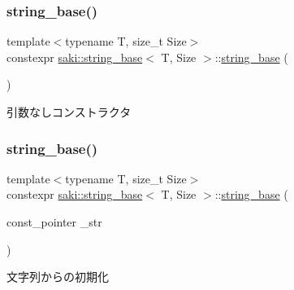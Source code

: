 \subsubsection{\texorpdfstring{string\+\_\+base()}{string\_base()}\hspace{0.1cm}{\footnotesize\ttfamily [1/3]}}
{\footnotesize\ttfamily template$<$typename T, size\+\_\+t Size$>$ \\
constexpr \mbox{\hyperlink{classsaki_1_1string__base}{saki\+::string\+\_\+base}}$<$ T, Size $>$\+::\mbox{\hyperlink{classsaki_1_1string__base}{string\+\_\+base}} (\begin{DoxyParamCaption}{ }\end{DoxyParamCaption})\hspace{0.3cm}{\ttfamily [inline]}}



引数なしコンストラクタ 

\mbox{\label{classsaki_1_1string__base_add4f032c858fa8e9f93ab0ab810488d2}} 
\subsubsection{\texorpdfstring{string\+\_\+base()}{string\_base()}\hspace{0.1cm}{\footnotesize\ttfamily [2/3]}}
{\footnotesize\ttfamily template$<$typename T, size\+\_\+t Size$>$ \\
constexpr \mbox{\hyperlink{classsaki_1_1string__base}{saki\+::string\+\_\+base}}$<$ T, Size $>$\+::\mbox{\hyperlink{classsaki_1_1string__base}{string\+\_\+base}} (\begin{DoxyParamCaption}\item[{const\+\_\+pointer}]{\+\_\+str }\end{DoxyParamCaption})\hspace{0.3cm}{\ttfamily [inline]}}



文字列からの初期化 

\mbox{\label{classsaki_1_1string__base_af9c199307f7a24ecef3e770cd537a715}} 
